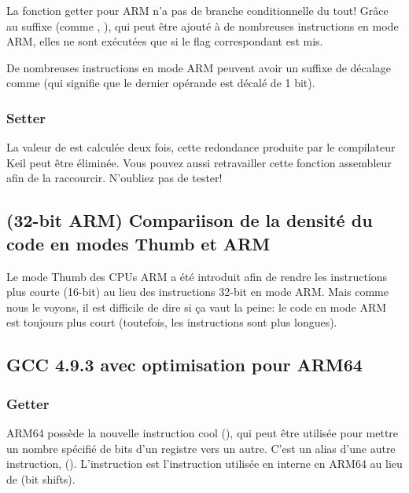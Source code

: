 La fonction getter pour ARM n'a pas de branche conditionnelle du tout!
Grâce au suffixe (comme , ), qui peut être ajouté à de nombreuses
instructions en mode ARM, elles ne sont exécutées que si le flag correspondant est
mis.

De nombreuses instructions en mode ARM peuvent avoir un suffixe de décalage comme
 (qui signifie que le dernier opérande est décalé de 1 bit).



\subsubsection{Setter}



La valeur de  est calculée deux fois, cette redondance produite par le
compilateur Keil peut être éliminée.
Vous pouvez aussi retravailler cette fonction assembleur afin de la raccourcir. N'oubliez
pas de tester!

\subsection{(32-bit ARM) Compariison de la densité du code en modes Thumb et ARM}

Le mode Thumb des CPUs ARM a été introduit afin de rendre les instructions plus courte
(16-bit) au lieu des instructions 32-bit en mode ARM.
Mais comme nous le voyons, il est difficile de dire si ça vaut la peine: le code en
mode ARM est toujours plus court (toutefois, les instructions sont plus longues).

\subsection{GCC 4.9.3 avec optimisation pour ARM64}

\subsubsection{Getter}



ARM64 possède la nouvelle instruction cool  (), qui peut être utilisée pour mettre un nombre
spécifié de bits d'un registre vers un autre.
C'est un alias d'une autre instruction,  ().
L'instruction  est l'instruction utilisée en interne en ARM64 au lieu de
 (bit shifts).

